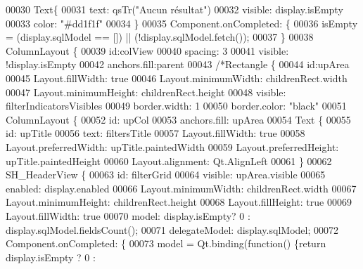 \begin{DoxyCode}
00030     Text\{
00031         text: qsTr(\textcolor{stringliteral}{"Aucun résultat"})
00032         visible: display.isEmpty
00033         color: \textcolor{stringliteral}{"#dd1f1f"}
00034     \}
00035     Component.onCompleted: \{
00036         isEmpty = (display.sqlModel == []) || (!display.sqlModel.fetch());
00037     \}
00038     ColumnLayout \{
00039         \textcolor{keywordtype}{id}:colView
00040         spacing: 3
00041         visible: !display.isEmpty
00042         anchors.fill:parent
00043         \textcolor{comment}{/*Rectangle \{}
00044 \textcolor{comment}{            id:upArea}
00045 \textcolor{comment}{            Layout.fillWidth: true}
00046 \textcolor{comment}{            Layout.minimumWidth: childrenRect.width}
00047 \textcolor{comment}{            Layout.minimumHeight: childrenRect.height}
00048 \textcolor{comment}{            visible: filterIndicatorsVisibles}
00049 \textcolor{comment}{            border.width: 1}
00050 \textcolor{comment}{            border.color: "black"}
00051 \textcolor{comment}{            ColumnLayout \{}
00052 \textcolor{comment}{                id: upCol}
00053 \textcolor{comment}{                anchors.fill: upArea}
00054 \textcolor{comment}{                Text \{}
00055 \textcolor{comment}{                    id: upTitle}
00056 \textcolor{comment}{                    text: filtersTitle}
00057 \textcolor{comment}{                    Layout.fillWidth: true}
00058 \textcolor{comment}{                    Layout.preferredWidth: upTitle.paintedWidth}
00059 \textcolor{comment}{                    Layout.preferredHeight: upTitle.paintedHeight}
00060 \textcolor{comment}{                    Layout.alignment: Qt.AlignLeft}
00061 \textcolor{comment}{                \}}
00062 \textcolor{comment}{                SH\_HeaderView \{}
00063 \textcolor{comment}{                    id: filterGrid}
00064 \textcolor{comment}{                    visible: upArea.visible}
00065 \textcolor{comment}{                    enabled: display.enabled}
00066 \textcolor{comment}{                    Layout.minimumWidth: childrenRect.width}
00067 \textcolor{comment}{                    Layout.minimumHeight: childrenRect.height}
00068 \textcolor{comment}{                    Layout.fillHeight: true}
00069 \textcolor{comment}{                    Layout.fillWidth: true}
00070 \textcolor{comment}{                    model: display.isEmpty? 0 : display.sqlModel.fieldsCount();}
00071 \textcolor{comment}{                    delegateModel: display.sqlModel;}
00072 \textcolor{comment}{                    Component.onCompleted: \{}
00073 \textcolor{comment}{                        model = Qt.binding(function() \{return display.isEmpty ? 0 :
}
\end{DoxyCode}
